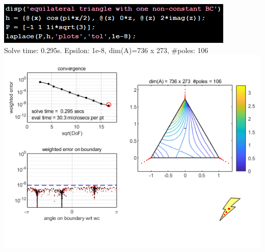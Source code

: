 \documentclass{seminar}
\begin{document}
\begin{slide} %
\small
\begin{center}
\includegraphics[scale=0.65]{./PNG/tri_code}\\
Solve time: 0.295s. Epsilon: 1e-8, dim(A)=736 x 273, {\#}poles: 106\\
\includegraphics[scale=0.55]{./PNG/tri_ncbcs}
\end{center}
\end{slide} %
\end{document}
